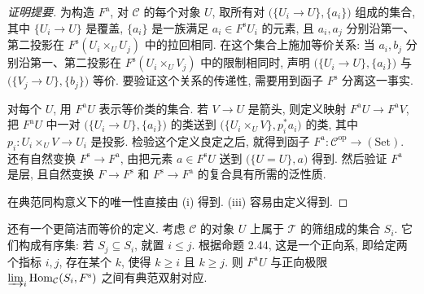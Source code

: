 \begin{proof}[证明提要]
为构造 $F^{\mathrm a}$, 对 $\mathcal C$ 的每个对象 $U$, 取所有对 $\bigl(\{U_i\to U\},\{a_i\}\bigr)$ 组成的集合, 其中 $\{U_i\to U\}$ 是覆盖, $\{a_i\}$ 是一族满足 $a_i\in F^{\mathrm s}U_i$ 的元素, 且 $a_i,a_j$ 分别沿第一、第二投影在 $F^{\mathrm s}(U_i\times_UU_j)$ 中的拉回相同. 在这个集合上施加等价关系: 当 $a_i,b_j$ 分别沿第一、第二投影在 $F^{\mathrm s}(U_i\times_UV_j)$ 中的限制相同时, 声明 $\bigl(\{U_i\to U\},\{a_i\}\bigr)$ 与 $\bigl(\{V_j\to U\},\{b_j\}\bigr)$ 等价. 要验证这个关系的传递性, 需要用到函子 $F^{\mathrm s}$ 分离这一事实.

对每个 $U$, 用 $F^{\mathrm a}U$ 表示等价类的集合. 若 $V\to U$ 是箭头, 则定义映射 $F^{\mathrm a}U\to F^{\mathrm a}V$, 把 $F^{\mathrm a}U$ 中一对 $\bigl(\{U_i\to U\},\{a_i\}\bigr)$ 的类送到 $\bigl(\{U_i\times_UV\},p_i^*a_i\bigr)$ 的类, 其中 $p_i:U_i\times_UV\to U_i$ 是投影. 检验这个定义良定之后, 就得到函子 $F^{\mathrm a}:\mathcal C^{\mathrm{op}}\to(\mathrm{Set})$. 还有自然变换 $F^{\mathrm s}\to F^{\mathrm a}$, 由把元素 $a\in F^{\mathrm s}U$ 送到 $\bigl(\{U=U\},a\bigr)$ 得到. 然后验证 $F^{\mathrm a}$ 是层, 且自然变换 $F\to F^{\mathrm s}$ 和 $F^{\mathrm s}\to F^{\mathrm a}$ 的复合具有所需的泛性质.

在典范同构意义下的唯一性直接由 (i) 得到. (iii) 容易由定义得到.
\end{proof}

还有一个更简洁而等价的定义. 考虑 $\mathcal C$ 的对象 $U$ 上属于 $\mathcal T$ 的筛组成的集合 $S_i$. 它们构成有序集: 若 $S_j\subseteq S_i$, 就置 $i\leq j$. 根据命题 2.44, 这是一个正向系, 即给定两个指标 $i,j$, 存在某个 $k$, 使得 $k\geq i$ 且 $k\geq j$. 则 $F^{\mathrm a}U$ 与正向极限 $\varinjlim_i\operatorname{Hom}_{\mathcal C}(S_i,F^{\mathrm s})$ 之间有典范双射对应.

